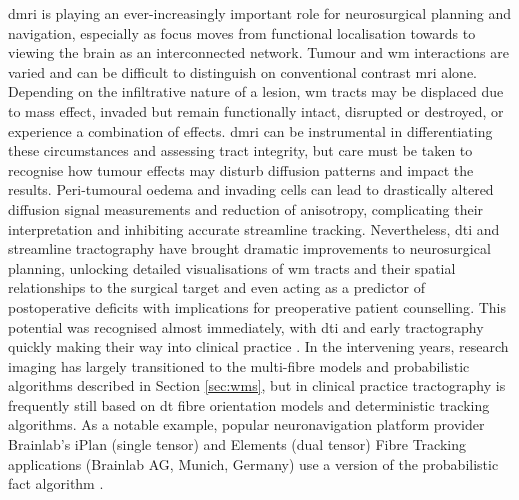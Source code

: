 \gls{dmri} is playing an ever-increasingly important role for neurosurgical planning and navigation\autocite{Manan2022}, especially as focus moves from functional localisation towards to viewing the brain as an interconnected network.
Tumour and \gls{wm} interactions are varied and can be difficult to distinguish on conventional contrast \gls{mri} alone.
Depending on the infiltrative nature of a lesion, \gls{wm} tracts may be displaced due to mass effect, invaded but remain functionally intact, disrupted or destroyed, or experience a combination of effects\autocite{Essayed2017,DSouza2019,Manan2023}.
\gls{dmri} can be instrumental in differentiating these circumstances and assessing tract integrity\autocite{Field2004,Manan2023}, but care must be taken to recognise how tumour effects may disturb diffusion patterns and impact the results.
Peri-tumoural oedema and invading cells can lead to drastically altered diffusion signal measurements and reduction of anisotropy, complicating their interpretation and inhibiting accurate streamline tracking\autocite{Bulakbas2009,Nimsky2010,Kuhnt2013}.
Nevertheless, \gls{dti} and streamline tractography have brought dramatic improvements to neurosurgical planning, unlocking detailed visualisations of \gls{wm} tracts and their spatial relationships to the surgical target and even acting as a predictor of postoperative deficits with implications for preoperative patient counselling\autocite{Manan2022}.
This potential was recognised almost immediately, with \gls{dti} and early tractography quickly making their way into clinical practice \autocite{Lee2001,Mori2002a,Nimsky2005}.
In the intervening years, research imaging has largely transitioned to the multi-fibre models and probabilistic algorithms described in Section \ref{sec:wms}, but in clinical practice tractography is frequently still based on \gls{dt} fibre orientation models \autocite{Toescu2020, Yang2021} and deterministic tracking algorithms.
As a notable example, popular neuronavigation platform provider Brainlab's iPlan\textregistered{} (single tensor)\autocite{Brainlab2012} and Elements (dual tensor)\autocite{Sollmann2020a} Fibre Tracking applications (Brainlab AG, Munich, Germany) use a version of the probabilistic \gls{fact} algorithm \autocite{Mori1999}.


